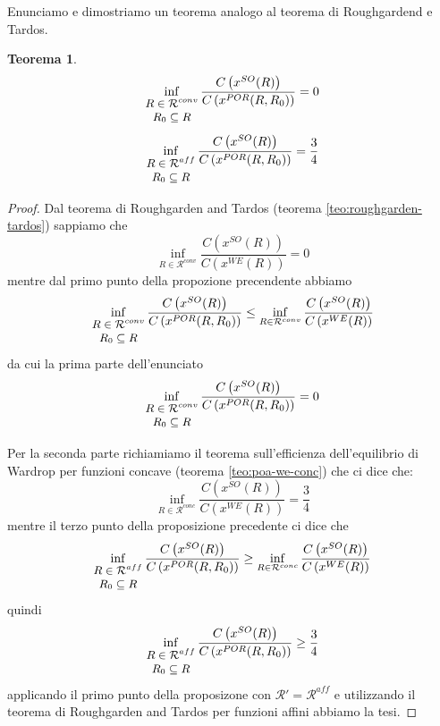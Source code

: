 \documentclass[a4paper]{article}
\theoremstyle{plain}
\newtheorem{myteo}{Teorema}[section]
\theoremstyle{definition}
\theoremstyle{remark}
\newcommand{\pa}[1]{\left(#1\right)}
\begin{document}
Enunciamo e dimostriamo un teorema analogo al teorema di Roughgardend
e Tardos.
\begin{myteo}
\label{teo:poa-por}
  \[ \inf _{\small\begin{matrix}R\in \mathcal{R}^{conv}\\R_0\subseteq
        R\end{matrix}}
    \frac{C\pa{x^{SO}(R)}}{C\pa{x^{POR}(R,R_0)}} = 0\]    
  \[ \inf _{\small\begin{matrix}R\in \mathcal{R}^{aff}\\R_0\subseteq
        R\end{matrix}}
    \frac{C\pa{x^{SO}(R)}}{C\pa{x^{POR}(R,R_0)}} = \frac{3}{4} \]    
\end{myteo}
\begin{proof}
  Dal teorema di Roughgarden and Tardos (teorema
  \ref{teo:roughgarden-tardos}) sappiamo che 
  \[ \inf _{R\in \mathcal{R}^{conv}} \frac{C\pa{ x^{SO}(R)}}{C\pa{
        x^{WE}(R)}} = 0 \]
  mentre dal primo punto della propozione precendente abbiamo
  \[ \inf _{\small\begin{matrix}R\in \mathcal{R}^{conv}\\R_0\subseteq
        R\end{matrix}}
    \frac{C\pa{x^{SO}(R)}}{C\pa{x^{POR}(R,R_0)}} \le
    \inf _{R\in \mathcal{R}^{conv}}
    \frac{C\pa{x^{SO}(R)}}{C\pa{x^{WE}(R)}}
  \]
  da cui la prima parte dell'enunciato
  \[ \inf _{\small\begin{matrix}R\in \mathcal{R}^{conv}\\R_0\subseteq
        R\end{matrix}}
    \frac{C\pa{x^{SO}(R)}}{C\pa{x^{POR}(R,R_0)}} = 0\]    
  
  Per la seconda parte richiamiamo il teorema sull'efficienza
  dell'equilibrio di Wardrop per funzioni concave (teorema
  \ref{teo:poa-we-conc}) che ci dice che:
  \[ \inf _{R\in \mathcal{R}^{conc}} \frac{C\pa{ x^{SO}(R)}}{C\pa{
        x^{WE}(R)}} = \frac{3}{4} \]
  mentre il terzo punto della proposizione precedente ci dice che
  \[ \inf _{\small\begin{matrix}R\in \mathcal{R}^{aff}\\R_0\subseteq
        R\end{matrix}}
    \frac{C\pa{x^{SO}(R)}}{C\pa{x^{POR}(R,R_0)}} \ge
    \inf _{R\in \mathcal{R}^{conc}}
    \frac{C\pa{x^{SO}(R)}}{C\pa{x^{WE}(R)}}
  \]
  quindi
  \[ \inf _{\small\begin{matrix}R\in \mathcal{R}^{aff}\\R_0\subseteq
        R\end{matrix}}
    \frac{C\pa{x^{SO}(R)}}{C\pa{x^{POR}(R,R_0)}} \ge \frac{3}{4} \]    
  applicando il primo punto della proposizone con $\mathcal{R}' =
  \mathcal{R}^{aff}$ e utilizzando il teorema di Roughgarden and
  Tardos per funzioni affini abbiamo la tesi.
\end{proof}
\end{document}
